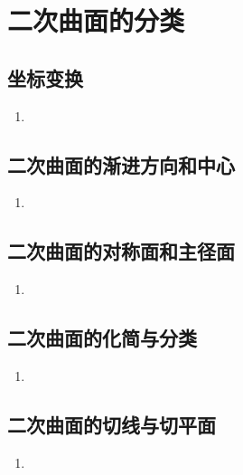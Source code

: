 \documentclass[UTF8]{ctexart}
\begin{document}
\section{二次曲面的分类}
\subsection{坐标变换}
\begin{enumerate}
\item
\end{enumerate}
\subsection{二次曲面的渐进方向和中心}
\begin{enumerate}

\item

\end{enumerate}

\subsection{二次曲面的对称面和主径面}
\begin{enumerate}

\item

\end{enumerate}

\subsection{二次曲面的化简与分类}
\begin{enumerate}

\item

\end{enumerate}

\subsection{二次曲面的切线与切平面}
\begin{enumerate}

\item

\end{enumerate}


\end{document}
